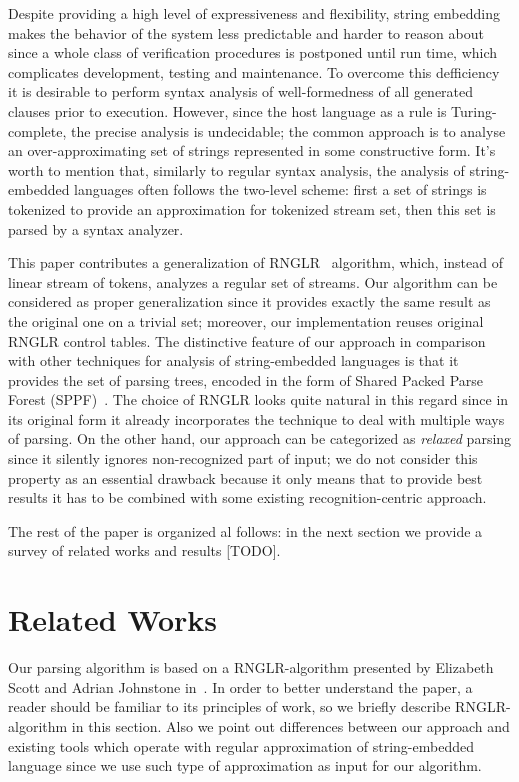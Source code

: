 \documentclass{llncs}
\begin{document}
Despite providing a high level of expressiveness and flexibility, string embedding makes the 
behavior of the system less predictable and harder to reason about since a whole class of 
verification procedures is postponed until run time, which complicates development, 
testing and maintenance. To overcome this defficiency it is desirable to perform syntax 
analysis of well-formedness of all generated clauses prior to execution. However, since the 
host language as a rule is Turing-complete, the precise analysis is undecidable; the common 
approach is to analyse an over-approximating set of strings represented in some constructive form. 
It's worth to mention that, similarly to regular syntax analysis, the analysis of string-embedded 
languages often follows the two-level scheme: first a set of strings is tokenized to provide an 
approximation for tokenized stream set, then this set is parsed by a syntax analyzer.

This paper contributes a generalization of RNGLR~\cite{RNGLR} algorithm, which, instead of
linear stream of tokens, analyzes a regular set of streams. Our algorithm can be considered as
proper generalization since it provides exactly the same result as the original one on a
trivial set; moreover, our implementation reuses original RNGLR control tables. The distinctive 
feature of our approach in comparison with other techniques for analysis of string-embedded 
languages is that it provides the set of parsing trees, encoded in the form of Shared Packed 
Parse Forest (SPPF)~\cite{SPPF}. The choice of RNGLR looks quite natural in this regard
since in its original form it already incorporates the technique to deal with multiple
ways of parsing. On the other hand, our approach can be categorized as \emph{relaxed} 
parsing since it silently ignores non-recognized part of input; we do not consider this 
property as an essential drawback because it only means that to provide best results
it has to be combined with some existing recognition-centric approach.

The rest of the paper is organized al follows: in the next section we provide a
survey of related works and results [TODO].

\section{Related Works}

Our parsing algorithm is based on a RNGLR-algorithm presented by Elizabeth Scott 
and Adrian Johnstone in~\cite{RNGLR}. In order to better understand the paper, a reader 
should be familiar to its principles of work, so we briefly describe RNGLR-algorithm 
in this section.  Also we point out differences between our approach and existing
tools which operate with regular approximation of string-embedded language since
we use such type of approximation as input for our algorithm.
\end{document}
